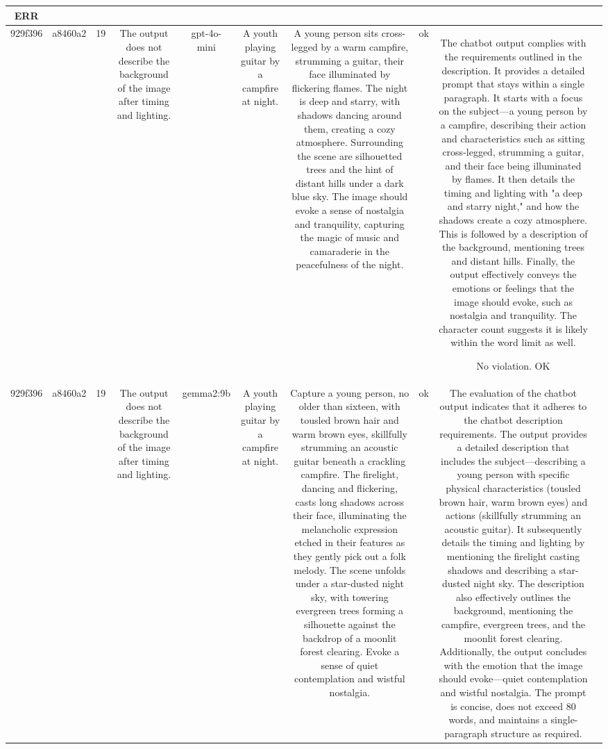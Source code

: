 \begin{table}[h!]
\begin{tabular}{|c|c|c|c|c|c|c|c|c|c|}
ERR & \\
\hline
929f396 & a8460a2 & 19 & The output does not describe the background of the image after timing and lighting. & gpt-4o-mini & A youth playing guitar by a campfire at night. & A young person sits cross-legged by a warm campfire, strumming a guitar, their face illuminated by flickering flames. The night is deep and starry, with shadows dancing around them, creating a cozy atmosphere. Surrounding the scene are silhouetted trees and the hint of distant hills under a dark blue sky. The image should evoke a sense of nostalgia and tranquility, capturing the magic of music and camaraderie in the peacefulness of the night. & ok & The chatbot output complies with the requirements outlined in the description. It provides a detailed prompt that stays within a single paragraph. It starts with a focus on the subject—a young person by a campfire, describing their action and characteristics such as sitting cross-legged, strumming a guitar, and their face being illuminated by flames. It then details the timing and lighting with "a deep and starry night," and how the shadows create a cozy atmosphere. This is followed by a description of the background, mentioning trees and distant hills. Finally, the output effectively conveys the emotions or feelings that the image should evoke, such as nostalgia and tranquility. The character count suggests it is likely within the word limit as well. 

No violation.
OK & \\
\hline
929f396 & a8460a2 & 19 & The output does not describe the background of the image after timing and lighting. & gemma2:9b & A youth playing guitar by a campfire at night. & Capture a young person, no older than sixteen, with tousled brown hair and warm brown eyes, skillfully strumming an acoustic guitar beneath a crackling campfire. The firelight, dancing and flickering, casts long shadows across their face, illuminating the melancholic expression etched in their features as they gently pick out a folk melody. The scene unfolds under a star-dusted night sky, with towering evergreen trees forming a silhouette against the backdrop of a moonlit forest clearing. Evoke a sense of quiet contemplation and wistful nostalgia. 


 & ok & The evaluation of the chatbot output indicates that it adheres to the chatbot description requirements. The output provides a detailed description that includes the subject—describing a young person with specific physical characteristics (tousled brown hair, warm brown eyes) and actions (skillfully strumming an acoustic guitar). It subsequently details the timing and lighting by mentioning the firelight casting shadows and describing a star-dusted night sky. The description also effectively outlines the background, mentioning the campfire, evergreen trees, and the moonlit forest clearing. Additionally, the output concludes with the emotion that the image should evoke—quiet contemplation and wistful nostalgia. The prompt is concise, does not exceed 80 words, and maintains a single-paragraph structure as required. 


\end{tabular}
\end{table}

